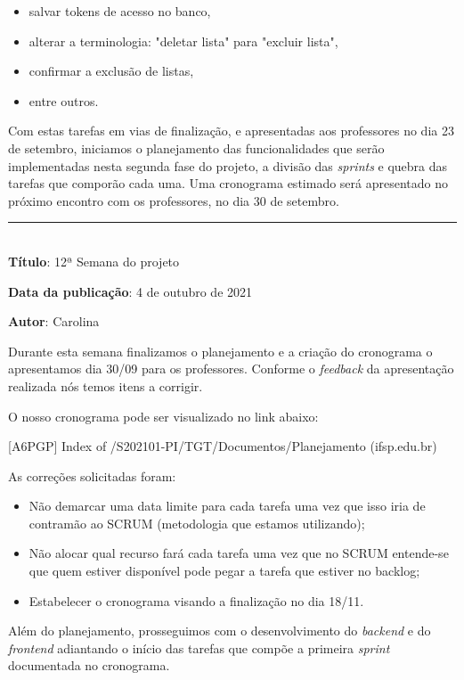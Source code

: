\begin{itemize}
	\item salvar tokens de acesso no banco,
	\item alterar a terminologia: "deletar lista" para "excluir lista",
	\item confirmar a exclusão de listas, 
	\item entre outros.
\end{itemize}

Com estas tarefas em vias de finalização, e apresentadas aos professores no dia 23 de setembro, iniciamos o planejamento das funcionalidades que serão implementadas nesta segunda fase do projeto, a divisão das \textit{\glspl{sprint}} e quebra das tarefas que comporão cada uma.  Uma cronograma estimado será apresentado no próximo encontro com os professores, no dia 30 de setembro. \\

\protect\rule{13cm}{.5pt}
\\

\textbf{Título}: 12ª Semana do projeto

\textbf{Data da publicação}: 4 de outubro de 2021

\textbf{Autor}: Carolina

Durante esta semana finalizamos o planejamento e a criação do cronograma o apresentamos dia 30/09 para os professores. Conforme o \textit{feedback} da apresentação realizada nós temos itens a corrigir.

O nosso cronograma pode ser visualizado no link abaixo:

[A6PGP] Index of /S202101-PI/TGT/Documentos/Planejamento (ifsp.edu.br)

As correções solicitadas foram:

\begin{itemize}
	\item Não demarcar uma data limite para cada tarefa uma vez que isso iria de contramão ao SCRUM (metodologia que estamos utilizando);
	\item Não alocar qual recurso fará cada tarefa uma vez que no SCRUM entende-se que quem estiver disponível pode pegar a tarefa que estiver no backlog;
	\item Estabelecer o cronograma visando a finalização no dia 18/11.
\end{itemize}

Além do planejamento, prosseguimos com o desenvolvimento do \textit{\gls{backend}} e do \textit{\gls{frontend}} adiantando o início das tarefas que compõe a primeira \textit{\gls{sprint}} documentada no cronograma. \\

